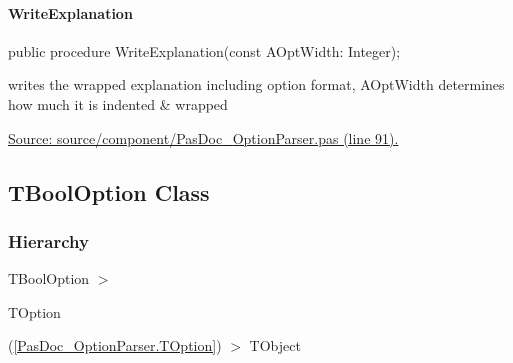 \documentclass{report}
\newif\ifpdf
\begin{document}
\paragraph*{WriteExplanation}\hspace*{\fill}

\label{PasDoc_OptionParser.TOption-WriteExplanation}
\begin{list}{}{
\setlength{\itemindent}{0cm}
\setlength{\listparindent}{0cm}
\setlength{\leftmargin}{\evensidemargin}
\addtolength{\leftmargin}{\tmplength}
\settowidth{\labelsep}{X}
\addtolength{\leftmargin}{\labelsep}
\setlength{\labelwidth}{\tmplength}
}
\item[\textbf{Declaration}\hfill]
\ifpdf
\begin{flushleft}
\fi
\begin{ttfamily}
public procedure WriteExplanation(const AOptWidth: Integer);\end{ttfamily}

\ifpdf
\end{flushleft}
\fi

\par
\item[\textbf{Description}]
writes the wrapped explanation including option format, AOptWidth determines how much it is indented {\&} wrapped\par
\href{https://github.com/pasdoc/pasdoc/blob/master/source/component/PasDoc_OptionParser.pas#L91}{Source: source/component/PasDoc{\_}OptionParser.pas (line 91).}

\end{list}
\ifpdf
\subsection*{\large{\textbf{TBoolOption Class}}\normalsize\hspace{1ex}\hrulefill}
\else
\subsection*{TBoolOption Class}
\fi
\label{PasDoc_OptionParser.TBoolOption}
\subsubsection*{\large{\textbf{Hierarchy}}\normalsize\hspace{1ex}\hfill}
TBoolOption {$>$} \begin{ttfamily}TOption\end{ttfamily}(\ref{PasDoc_OptionParser.TOption}) {$>$} 
TObject
\end{document}

